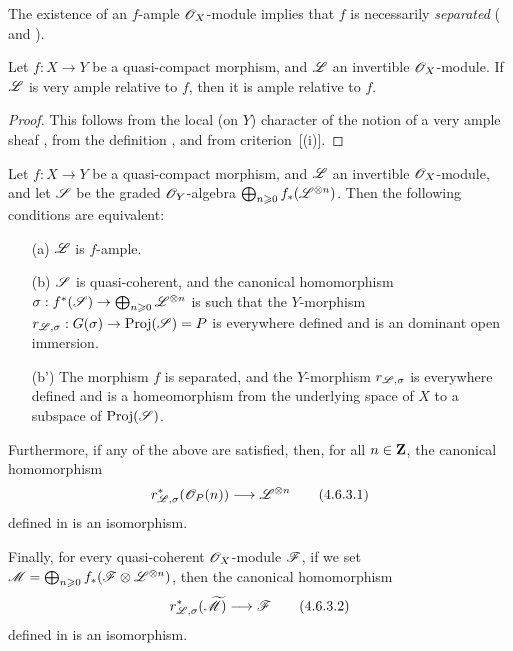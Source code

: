 The existence of an $f$-ample $\mathscr{O}_X$-module implies that $f$ is necessarily \emph{separated} ( and ).

\begin{proposition}[4.6.2]
\label{II.4.6.2}
Let $f: X\to Y$ be a quasi-compact morphism, and $\mathscr{L}$ an invertible $\mathscr{O}_X$-module.
If $\mathscr{L}$ is very ample relative to $f$, then it is ample relative to $f$.
\end{proposition}

\begin{proof}
This follows from the local (on $Y$) character of the notion of a very ample sheaf , from the definition , and from criterion~[(i)].
\end{proof}

\begin{proposition}[4.6.3]
\label{II.4.6.3}
Let $f: X\to Y$ be a quasi-compact morphism, and $\mathscr{L}$ an invertible $\mathscr{O}_X$-module, and let $\mathscr{S}$ be the graded $\mathscr{O}_Y$-algebra $\bigoplus_{n\geqslant0}f_*(\mathscr{L}^{\otimes n})$.
Then the following conditions are equivalent:
\begin{enumerate}
  \item[\rm{(a)}] $\mathscr{L}$ is $f$-ample.
  \item[\rm{(b)}] $\mathscr{S}$ is quasi-coherent, and the canonical homomorphism $\sigma:f^*(\sh{S})\to\bigoplus_{n\geq0}\sh{L}^{\otimes n}$  is such that the $Y$-morphism $r_{\sh{L},\sigma}:G(\sigma)\to\Proj(\sh{S})=P$ is everywhere defined and is an dominant open immersion.
  \item[\rm{(b')}] The morphism $f$ is separated, and the $Y$-morphism $r_{\mathscr{L},\sigma}$ is everywhere defined and is a homeomorphism from the underlying space of $X$ to a subspace of $\operatorname{Proj}(\mathscr{S})$.
\end{enumerate}

Furthermore, if any of the above are satisfied, then, for all $n\in\mathbf{Z}$, the canonical homomorphism
\[
\label{II.4.6.3.1}
  r_{\sh{L},\sigma}^*(\sh{O}_P(n)) \to \sh{L}^{\otimes n}
\tag{4.6.3.1}
\]
defined in  is an isomorphism.

Finally, for every quasi-coherent $\mathscr{O}_X$-module $\mathscr{F}$, if we set $\mathscr{M}=\bigoplus_{n\geqslant0}f_*(\mathscr{F}\otimes\mathscr{L}^{\otimes n})$, then the canonical homomorphism
\[
\label{II.4.6.3.2}
  r_{\sh{L},\sigma}^*(\widetilde{\sh{M}}) \to \sh{F}
\tag{4.6.3.2}
\]
defined in  is an isomorphism.
\end{proposition}

